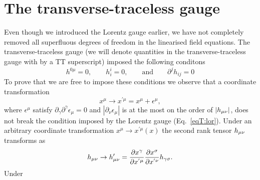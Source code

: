 \section{The transverse-traceless gauge}
Even though we introduced the Lorentz gauge earlier, we have not completely removed all superfluous degrees of freedom 
in the linearised field equations. The transverse-traceless gauge (we will denote quantities in
the transverse-traceless gauge with by a TT superscript) imposed the following conditons
\begin{equation}
h^{0 \mu} = 0, \qquad h^{i}_{i} = 0, \qquad \text{and} \qquad \partial^j h_{ij} = 0
\end{equation}
To prove that we are free to impose these conditions we observe that a coordinate transformation 
\begin{equation} \label{eqT:ct}
x^{\mu} \rightarrow x^{'\mu} = x^{\mu} + \epsilon^{\mu},
\end{equation}
where $\epsilon^{\mu}$ satisfy $\partial_{\gamma} \partial^{\gamma} \epsilon_{\mu} = 0$ 
and $|\partial_{\nu} \epsilon_{\mu}|$ is at the most on the order of $|h_{\mu\nu}|$,
does not break the condition imposed by the Lorentz gauge (Eq.~\ref{eqT:lor}).
Under an arbitrary coordinate transformation $x^{\mu} \rightarrow x^{'\mu}(x)$ the second rank tensor $h_{\mu\nu}$ transforms as
\begin{equation} \label{eqT:t2c}
h_{\mu\nu} \rightarrow h'_{\mu\nu} = \frac{\partial x^{\gamma}}{\partial x^{'\mu}} \frac{\partial x^{\sigma}}{\partial x^{'\nu}} h_{\gamma \sigma}.
\end{equation}
Under 

